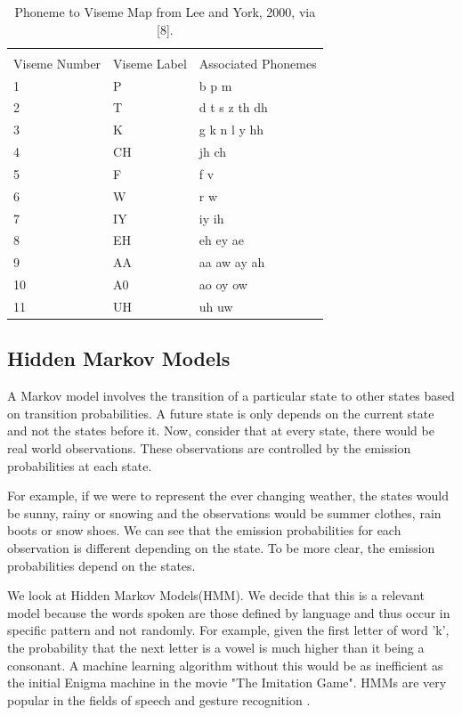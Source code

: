 \documentclass[a4paper]{article}
\begin{document}
\begin{table}[!ht]
\center
\caption{Phoneme to Viseme Map from Lee and York, 2000, via [8].}
\begin{tabular}{l l l}
\hline\hline\\
Viseme Number & Viseme Label & Associated Phonemes\\
 \hline
1   & P      &  b p m \\ 
2   & T      &  d t s z th dh\\
3   & K      &   g k n l y hh\\
4   & CH   &   jh ch\\
5   & F      &   f v\\
6   & W     &   r w\\
7   & IY     &   iy ih\\
8   & EH   &   eh ey ae\\
9   & AA    &   aa aw ay ah\\
10   & A0  &   ao oy ow\\
11 & UH   &   uh uw\\
\end{tabular}
\label{tab:pv}
\end{table}


\subsection{Hidden Markov Models}

A Markov model involves the transition of a particular state to other states based on transition probabilities. A future state is only depends on the current state and not the states before it. Now, consider that at every state, there would be real world observations. These observations are controlled by the emission probabilities at each state.

For example, if we were to represent the ever changing weather, the states would be sunny, rainy or snowing and the observations would be summer clothes, rain boots or snow shoes. We can see that the emission probabilities for each observation is different depending on the state. To be more clear, the emission probabilities depend on the states.

We look at Hidden Markov Models(HMM). We decide that this is a relevant model because the words spoken are those defined by language and thus occur in specific pattern and not randomly. For example, given the first letter of word 'k', the probability that the next letter is a vowel is much higher than it being a consonant. A machine learning algorithm without this would be as inefficient as the initial Enigma machine in the movie "The Imitation Game". HMMs are very popular in the fields of speech \cite{key-2} and gesture recognition \cite{key-4} \cite{key-5}.
\end{document}
